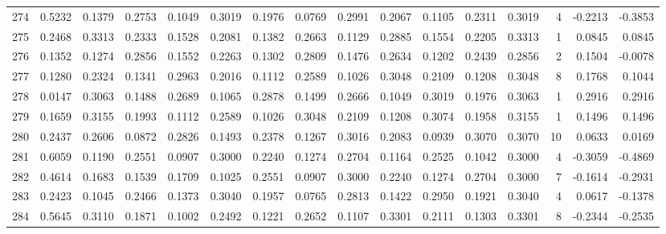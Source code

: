 \begin{tabular}{lrrrrrrrrrrrrrrr}
274 &      0.5232 &  0.1379 &  0.2753 &  0.1049 &  0.3019 &  0.1976 &  0.0769 &  0.2991 &  0.2067 &  0.1105 &   0.2311 &     0.3019 &      4 &                   -0.2213 &                    -0.3853 \\
275 &      0.2468 &  0.3313 &  0.2333 &  0.1528 &  0.2081 &  0.1382 &  0.2663 &  0.1129 &  0.2885 &  0.1554 &   0.2205 &     0.3313 &      1 &                    0.0845 &                     0.0845 \\
276 &      0.1352 &  0.1274 &  0.2856 &  0.1552 &  0.2263 &  0.1302 &  0.2809 &  0.1476 &  0.2634 &  0.1202 &   0.2439 &     0.2856 &      2 &                    0.1504 &                    -0.0078 \\
277 &      0.1280 &  0.2324 &  0.1341 &  0.2963 &  0.2016 &  0.1112 &  0.2589 &  0.1026 &  0.3048 &  0.2109 &   0.1208 &     0.3048 &      8 &                    0.1768 &                     0.1044 \\
278 &      0.0147 &  0.3063 &  0.1488 &  0.2689 &  0.1065 &  0.2878 &  0.1499 &  0.2666 &  0.1049 &  0.3019 &   0.1976 &     0.3063 &      1 &                    0.2916 &                     0.2916 \\
279 &      0.1659 &  0.3155 &  0.1993 &  0.1112 &  0.2589 &  0.1026 &  0.3048 &  0.2109 &  0.1208 &  0.3074 &   0.1958 &     0.3155 &      1 &                    0.1496 &                     0.1496 \\
280 &      0.2437 &  0.2606 &  0.0872 &  0.2826 &  0.1493 &  0.2378 &  0.1267 &  0.3016 &  0.2083 &  0.0939 &   0.3070 &     0.3070 &     10 &                    0.0633 &                     0.0169 \\
281 &      0.6059 &  0.1190 &  0.2551 &  0.0907 &  0.3000 &  0.2240 &  0.1274 &  0.2704 &  0.1164 &  0.2525 &   0.1042 &     0.3000 &      4 &                   -0.3059 &                    -0.4869 \\
282 &      0.4614 &  0.1683 &  0.1539 &  0.1709 &  0.1025 &  0.2551 &  0.0907 &  0.3000 &  0.2240 &  0.1274 &   0.2704 &     0.3000 &      7 &                   -0.1614 &                    -0.2931 \\
283 &      0.2423 &  0.1045 &  0.2466 &  0.1373 &  0.3040 &  0.1957 &  0.0765 &  0.2813 &  0.1422 &  0.2950 &   0.1921 &     0.3040 &      4 &                    0.0617 &                    -0.1378 \\
284 &      0.5645 &  0.3110 &  0.1871 &  0.1002 &  0.2492 &  0.1221 &  0.2652 &  0.1107 &  0.3301 &  0.2111 &   0.1303 &     0.3301 &      8 &                   -0.2344 &                    -0.2535 \\

\end{tabular}
